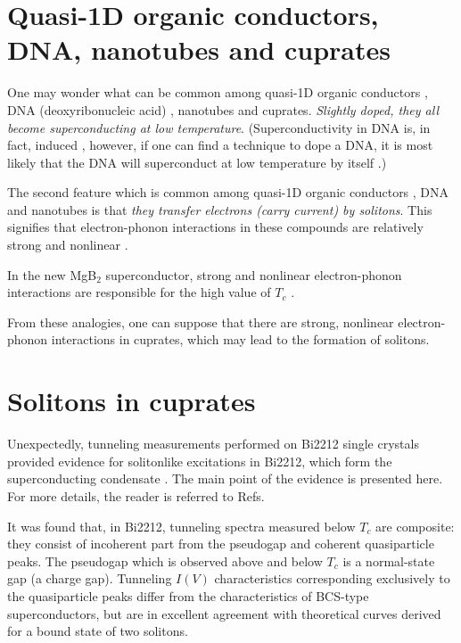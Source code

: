 \section{Quasi-1D organic conductors, DNA, nanotubes and cuprates}

One may wonder what can be common among quasi-1D organic conductors
\cite{Jerome}, DNA (deoxyribonucleic acid) \cite{Kasumov1}, nanotubes 
\cite{Kasumov2} and cuprates. 
{\em Slightly doped, they all become superconducting at low temperature}. 
(Superconductivity in DNA is, in fact, induced \cite{Kasumov1}, however, if
one can find a technique to dope a DNA, it is most likely that the DNA will 
superconduct at low temperature by itself \cite{Kasumov3}.)

The second feature which is common among quasi-1D organic conductors
\cite{Davydov1,Davydov3,Ness}, DNA \cite{biology} and nanotubes 
\cite{Chamon,Astahova} 
is that {\em they transfer electrons (carry current) by solitons}. This 
signifies that electron-phonon interactions in these compounds are 
relatively strong and nonlinear \cite{Davydov1,Davydov3}. 

In the new MgB$_{2}$ superconductor, strong and nonlinear electron-phonon 
interactions are responsible for the high value of $T_{c}$ \cite{MgB2-2}. 

From these analogies, one can suppose that there are strong, nonlinear 
electron-phonon interactions in cuprates, which may lead to the formation 
of solitons.

\section{Solitons in cuprates}

Unexpectedly, tunneling measurements performed on Bi2212 single 
crystals provided evidence for solitonlike excitations
in Bi2212, which form the superconducting condensate 
\cite{AMour2,AMour3}. The main point of the evidence is presented here. 
For more details, the reader is referred to Refs\cite{AMour2,AMour3}.

It was found that, in Bi2212, tunneling spectra measured below $T_{c}$ 
are composite: they consist of incoherent part from the pseudogap and 
coherent quasiparticle peaks. The pseudogap which is observed above and 
below $T_{c}$ is a normal-state gap (a charge gap). Tunneling 
$I(V)$ characteristics corresponding exclusively to the quasiparticle peaks 
differ from the characteristics of BCS-type superconductors, but are in 
excellent agreement with theoretical curves derived for a bound state of 
two solitons. 

